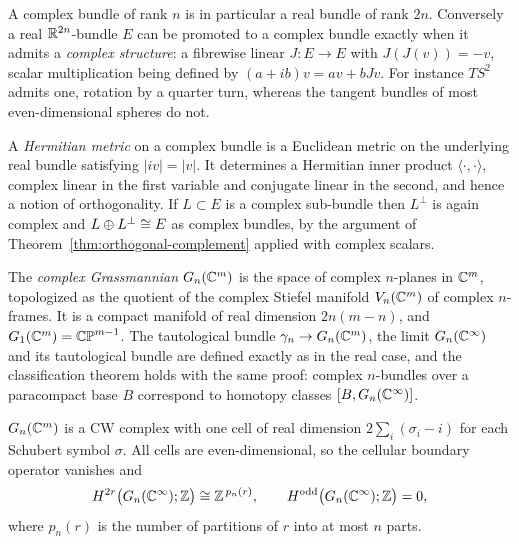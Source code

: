 \begin{remark}
A complex bundle of rank $n$ is in particular a real bundle of rank $2n$.
Conversely a real $\mathbb{R}^{2n}$-bundle $E$ can be promoted to a complex bundle
exactly when it admits a \emph{complex structure}: a fibrewise linear
$J\colon E\to E$ with $J(J(v))=-v$, scalar multiplication being defined by
$(a+ib)v=av+bJv$. For instance $TS^2$ admits one, rotation by a quarter turn,
whereas the tangent bundles of most even-dimensional spheres do not.
\end{remark}

\begin{definition}
A \emph{Hermitian metric} on a complex bundle is a Euclidean metric on the
underlying real bundle satisfying $|iv|=|v|$. It determines a Hermitian inner
product $\langle\cdot,\cdot\rangle$, complex linear in the first variable and
conjugate linear in the second, and hence a notion of orthogonality. If
$L\subset E$ is a complex sub-bundle then $L^\perp$ is again complex and
$L\oplus L^\perp\cong E$ as complex bundles, by the argument of
Theorem~\ref{thm:orthogonal-complement} applied with complex scalars.
\end{definition}

\begin{definition}
The \emph{complex Grassmannian} $G_n(\mathbb{C}^m)$ is the space of complex $n$-planes
in $\mathbb{C}^m$, topologized as the quotient of the complex Stiefel manifold
$V_n(\mathbb{C}^m)$ of complex $n$-frames. It is a compact manifold of real dimension
$2n(m-n)$, and $G_1(\mathbb{C}^m)=\mathbb{CP}^{m-1}$. The tautological bundle
$\gamma_n\to G_n(\mathbb{C}^m)$, the limit $G_n(\mathbb{C}^\infty)$ and its tautological bundle
are defined exactly as in the real case, and the classification theorem holds
with the same proof: complex $n$-bundles over a paracompact base $B$ correspond
to homotopy classes $[B,G_n(\mathbb{C}^\infty)]$.
\end{definition}

\begin{theorem}\label{thm:complex-cells}
$G_n(\mathbb{C}^m)$ is a CW complex with one cell of real dimension
$2\sum_i(\sigma_i-i)$ for each Schubert symbol $\sigma$. All cells are
even-dimensional, so the cellular boundary operator vanishes and
\[
H^{2r}\big(G_n(\mathbb{C}^\infty);\mathbb{Z}\big)\cong\mathbb{Z}^{\,p_n(r)},
\qquad
H^{\mathrm{odd}}\big(G_n(\mathbb{C}^\infty);\mathbb{Z}\big)=0,
\]
where $p_n(r)$ is the number of partitions of $r$ into at most $n$ parts.
\end{theorem}

